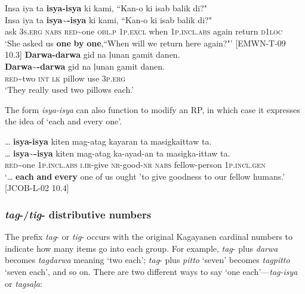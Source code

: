 \ea
Insa  iya  ta  \textbf{isya-isya}  ki  kami, ``Kan-o  ki  isab  balik di?" \\\smallskip
 \gll Insa  iya  ta  \textbf{isya\sim{}-isya}  ki  kami, ``Kan-o  ki  isab  balik di?" \\
ask  3\textsc{s.erg}  \textsc{nabs}  \textsc{red}\sim{}one  \textsc{obl.p}  1\textsc{p.excl}  when  1\textsc{p.incl.abs}  again  return \textsc{d}1\textsc{loc} \\
\glt ‘She asked us \textbf{one} \textbf{by} \textbf{one},``When will we return here again?"’ [EMWN-T-09 10.3]
\z
\ea
\textbf{Darwa-darwa}  gid  na  ļunan  gamit  danen. \\\smallskip
 \gll \textbf{Darwa\sim{}-darwa}  gid  na  ļunan  gamit  danen. \\
\textsc{red}\sim{}two  \textsc{int}  \textsc{lk}  pillow  use  3\textsc{p.erg} \\
\glt ‘They really used two pillows each.’
\z

The form \textit{isya-isya} can also function to modify an RP, in which case it expresses the idea of ‘each and every one’.

\ea
… \textbf{isya-isya}  kiten  mag-atag  kayaran ta  masigkaittaw ta. \\\smallskip
 \gll … \textbf{isya\sim{}-isya}  kiten  mag-atag  ka-ayad-an ta  masigka-ittaw ta. \\
{} \textsc{red}\sim{}one  1\textsc{p.incl.abs}  \textsc{i.ir}-give  \textsc{nr}-good-\textsc{nr}
\textsc{nabs}  fellow-person 1\textsc{p.incl.gen} \\
\glt`… \textbf{each} \textbf{and} \textbf{every} one of us ought ’to give goodness to our fellow humans.’ [JCOB-L-02 10.4]
\z

\subsubsection{\textit{tag}{}-/\textit{tig}{}- distributive numbers}
\label{sec:tag-distributivenumbers} 

The prefix \textit{tag}{}- or \textit{tig}{}- occurs with the original Kagayanen cardinal numbers to indicate how many items go into each group. For example, \textit{tag}{}- plus \textit{darwa} becomes \textit{tagdarwa} meaning ‘two each’; \textit{tag}{}- plus \textit{pitto} ‘seven’ becomes \textit{tagpitto} ‘seven each’, and so on. There are two different ways to say ‘one each’---\textit{tag-isya} or \textit{tagsaļa}:

